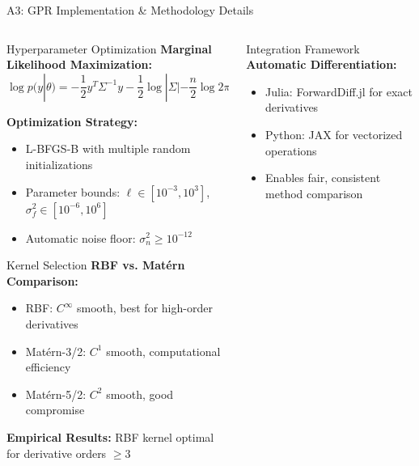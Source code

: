 \documentclass[aspectratio=169]{beamer}
\begin{document}
\begin{frame}{A3: GPR Implementation \& Methodology Details}
  
  \begin{columns}[t]
    \begin{column}{0.48\textwidth}
      \begin{block}{\small Hyperparameter Optimization}
        \tiny
        \textbf{Marginal Likelihood Maximization:}
        $$\log p(y|\theta) = -\frac{1}{2}y^T\Sigma^{-1}y - \frac{1}{2}\log|\Sigma| - \frac{n}{2}\log 2\pi$$
        
        \textbf{Optimization Strategy:}
        \begin{itemize}
          \item L-BFGS-B with multiple random initializations
          \item Parameter bounds: $\ell \in [10^{-3}, 10^3]$, $\sigma_f^2 \in [10^{-6}, 10^6]$
          \item Automatic noise floor: $\sigma_n^2 \geq 10^{-12}$
        \end{itemize}
      \end{block}
      
      \vspace{0.5em}
      \begin{block}{\small Kernel Selection}
        \tiny
        \textbf{RBF vs. Matérn Comparison:}
        \begin{itemize}
          \item RBF: $C^{\infty}$ smooth, best for high-order derivatives
          \item Matérn-3/2: $C^1$ smooth, computational efficiency
          \item Matérn-5/2: $C^2$ smooth, good compromise
        \end{itemize}
        
        \textbf{Empirical Results:} RBF kernel optimal for derivative orders $\geq 3$
      \end{block}
    \end{column}
    
    \begin{column}{0.48\textwidth}
      \begin{block}{\small Integration Framework}
        \tiny
        \textbf{Automatic Differentiation:}
        \begin{itemize}
          \item Julia: ForwardDiff.jl for exact derivatives
          \item Python: JAX for vectorized operations
          \item Enables fair, consistent method comparison
        \end{itemize}
        

\end{block}
\end{column}
\end{columns}
\end{frame}
\end{document}
